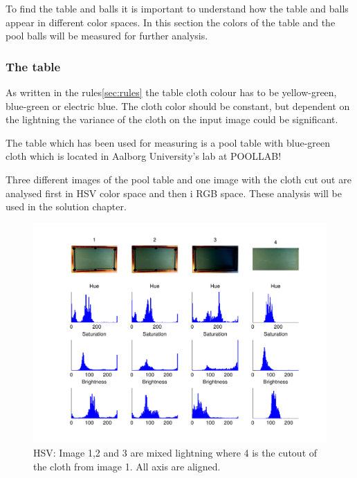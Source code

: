 To find the table and balls it is important to understand how the table and balls appear in different color spaces. In this section the colors of the table and the pool balls will be measured for further analysis.\\

\subsubsection{The table}
As written in the rules\ref{sec:rules} the table cloth colour has to be yellow-green, blue-green or electric blue. The cloth color should be constant, but dependent on the lightning the variance of the cloth on the input image could be significant.

The table which has been used for measuring is a pool table with blue-green cloth which is located in Aalborg University's lab at POOLLAB!

Three different images of the pool table and one image with the cloth cut out are analysed first in HSV color space and then i RGB space. These analysis will be used in the solution chapter.

\begin{figure}[H]
\begin{center}
\leavevmode
\includegraphics[width=1\textwidth]{images/hsv_hist_table}
\end{center}
\caption{HSV: Image 1,2 and 3 are mixed lightning where 4 is the cutout of the cloth from image 1. All axis are aligned.}
\label{fig:tablehsv}
\end{figure}

